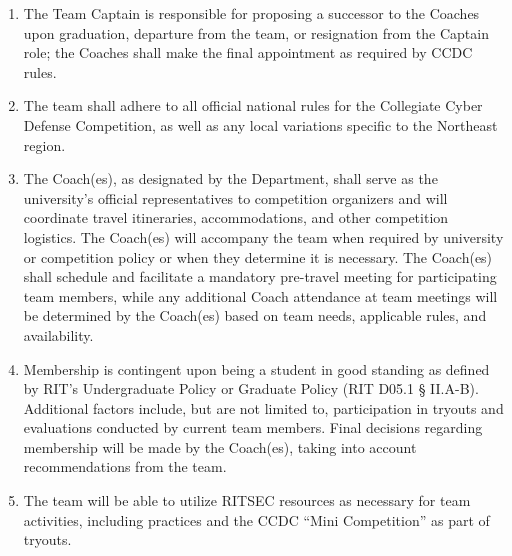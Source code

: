 \begin{enumerate}
	\item The Team Captain is responsible for proposing a successor to the Coaches upon graduation, 
            departure from the team, or resignation from the Captain role; the Coaches shall make the 
            final appointment as required by CCDC rules.
	\item The team shall adhere to all official national rules for the Collegiate Cyber Defense 
            Competition, as well as any local variations specific to the Northeast region.
	\item The Coach(es), as designated by the Department, shall serve as the university’s official 
            representatives to competition organizers and will coordinate travel itineraries, 
            accommodations, and other competition logistics. The Coach(es) will accompany the team 
            when required by university or competition policy or when they determine it is necessary. 
            The Coach(es) shall schedule and facilitate a mandatory pre-travel meeting for participating 
            team members, while any additional Coach attendance at team meetings will be determined by the 
            Coach(es) based on team needs, applicable rules, and availability.
      \item Membership is contingent upon being a student in good standing as defined by RIT’s Undergraduate 
            Policy or Graduate Policy (RIT D05.1 § II.A-B). Additional factors include, but are not limited to, 
            participation in tryouts and evaluations conducted by current team members. Final decisions regarding 
            membership will be made by the Coach(es), taking into account recommendations from the team.
      \item The team will be able to utilize RITSEC resources as necessary for team activities, including practices 
            and the CCDC “Mini Competition” as part of tryouts.
\end{enumerate}
